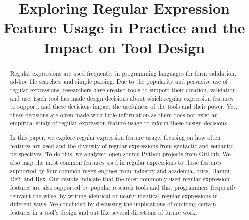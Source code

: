 \documentclass[conference]{IEEEtran}
\begin{document}
%
\title{Exploring Regular Expression Feature Usage in Practice and the Impact on Tool Design}

\author{
}

\maketitle


\begin{abstract}
Regular expressions are used frequently in programming languages for form validation, ad-hoc file searches, and simple parsing. Due to the popularity and pervasive use of regular expressions, researchers have created tools to support their creation, validation, and use. Each tool has made design decisions about which regular expression features to support, and these decisions impact the usefulness of the tools and their power. Yet, these decisions are often made with little information as there does not exist an empirical study of regular expression feature usage to inform these design decisions.

In this paper, we explore regular expression feature usage, focusing on how often features are used and the diversity of regular expressions from syntactic and semantic perspectives. To do this, we analyzed  open source Python projects from GitHub.
We also map the most common features used in regular expressions to those features supported by four common regex engines from industry and academia, brics, Hampi, Re2, and Rex.
Our results indicate that the most commonly used regular expression features are also supported by popular research tools and that programmers frequently reinvent the wheel by writing identical or nearly identical regular expressions in different ways.
We concluded by discussing the implications of omitting certain features in a tool's design and out like several directions of future work.
\end{abstract}
\end{document}
